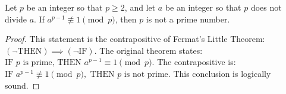 \begin{corollary}
Let $p$ be an integer so that $p \ge 2$, and let $a$ be an integer so that $p$ does not divide $a$. If $a^{p-1} \not\equiv 1 \pmod{p}$, then $p$ is not a prime number.
\end{corollary}
\begin{proof}
This statement is the contrapositive of Fermat's Little Theorem:
$(\neg \text{THEN}) \implies (\neg \text{IF})$.
The original theorem states: $\text{IF } p \text{ is prime, THEN } a^{p-1} \equiv 1 \pmod{p}$.
The contrapositive is: $\text{IF } a^{p-1} \not\equiv 1 \pmod{p}, \text{ THEN } p \text{ is not prime}$.
This conclusion is logically sound.
\end{proof}

\bigskip
